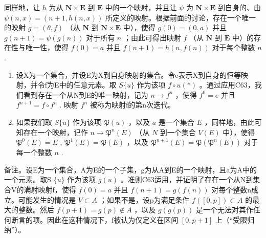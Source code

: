 同样地，让 \(h\) 为从 \(\mathbf{N} \times \mathbf{E}\) 到 \(\mathbf{E}\) 中的一个映射，并且让 \(\psi\) 为 \(\mathbf{N} \times \mathbf{E}\) 到自身的、由 \(\psi(n, x) = (n + 1, h(n, x))\) 所定义的映射。根据前面的讨论，存在一个唯一的映射 \(g = (\theta, f)\) （从 \(\mathbf{N}\) 到 \(\mathbf{N} \times \mathbf{E}\) 中），使得 \(g(0) = (0, a)\) 并且 \(g(n + 1) = \psi(g(n))\) 对于所有 \(n\) ；由此可得出映射 \(f\) （从 \(\mathbf{N}\) 到 \(\mathbf{E}\) 中）的存在性与唯一性，使得 \(f(0) = a\) 并且 \(f(n + 1) = h(n, f(n))\) 对于每个整数 \(n\) .

\begin{enumerate}
\def\labelenumi{(\arabic{enumi})}
\setcounter{enumi}{1}
\item
  设X为一个集合，并设E为X到自身映射的集合。令e表示X到自身的恒等映射，并令f为E中的任意元素。取 \(S\{u\}\) 作为该项 \(f \circ u (*)\) 。通过应用C63，我们看到存在一个从N到E的唯一映射，记为 \(n \to f^n\) ，使得 \(f^0 = e\) 并且 \(f^{n+1} = f \circ f^n\) . 映射 \(f^n\) 被称为映射f的第n次迭代。
\item
  如果我们取 \(S \{u\}\) 作为该项 \(\mathfrak{P}(u)\) ，以及 \(a\) 是一个集合 \(E\) ，同样地，由此可知存在一个映射，记作 \(n \to \mathfrak{P}^n(E)\) （从 \(N\) 到一个集合 \(V(E)\) 中），使得 \(\mathfrak{P}^0(E) = E\) , \(\mathfrak{P}^1(E) = \mathfrak{P}(E)\) ，以及 \(\mathfrak{P}^{n+1}(E) = \mathfrak{P}(\mathfrak{P}^n(E))\) 对于每一个整数 \(n\) .
\end{enumerate}

备注。设E为一个集合，A为E的一个子集，g为从A到E的一个映射，且a为A中的一个元素。取S \(\{u\}\) 作为该项 \(g(u)\) 。准则C63适用，并证明了存在一个从N到集合V的满射映射f，使得 \(f(0) = a\) 并且 \(f(n+1) = g(f(n))\) 对每个整数n成立。可能发生的情况是 \(V \subset A\) ；如果不是，设p为满足条件 \(f([0, p]) \subset A\) 的最大的整数。然后 \(f(p+1) = g(p) \notin A\) ，以及 \(g(g(p))\) 是一个无法对其作任何断言的项。因此在这种情况下，f被认为仅定义在区间 \([0, p+1]\) 上（“受限归纳”）。

